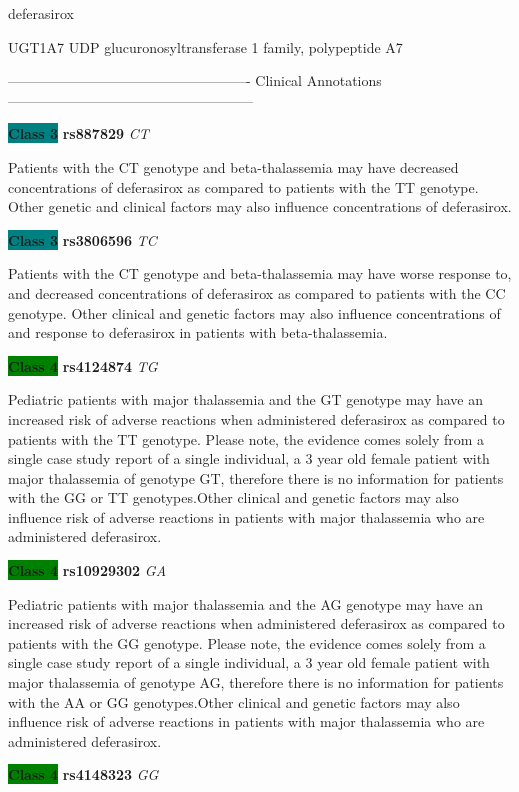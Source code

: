 \documentclass{resume} %
\begin{document}
\begin{rSection}{ deferasirox }
\begin{rSubsection}{ UGT1A7 }{ UDP glucuronosyltransferase 1 family, polypeptide A7 }{}{}
\item[] ---------------------------------------------------- Clinical Annotations -----------------------------------------------------\newline
\item \textbf{\colorbox{teal} {Class 3}} \textbf{ rs887829 } \textit{ CT }
\item[] Patients with the CT genotype and beta-thalassemia may have decreased concentrations of deferasirox as compared to patients with the TT genotype. Other genetic and clinical factors may also influence concentrations of deferasirox.\item \textbf{\colorbox{teal} {Class 3}} \textbf{ rs3806596 } \textit{ TC }
\item[] Patients with the CT genotype and beta-thalassemia may have worse response to, and decreased concentrations of deferasirox as compared to patients with the CC genotype. Other clinical and genetic factors may also influence concentrations of and response to deferasirox in patients with beta-thalassemia.\item \textbf{\colorbox{green} {Class 4}} \textbf{ rs4124874 } \textit{ TG }
\item[] Pediatric patients with major thalassemia and the GT genotype may have an increased risk of adverse reactions when administered deferasirox as compared to patients with the TT genotype. Please note, the evidence comes solely from a single case study report of a single individual, a 3 year old female patient with major thalassemia of genotype GT, therefore there is no information for patients with the GG or TT genotypes.Other clinical and genetic factors may also influence risk of adverse reactions in patients with major thalassemia who are administered deferasirox. \item \textbf{\colorbox{green} {Class 4}} \textbf{ rs10929302 } \textit{ GA }
\item[] Pediatric patients with major thalassemia and the AG genotype may have an increased risk of adverse reactions when administered deferasirox as compared to patients with the GG genotype. Please note, the evidence comes solely from a single case study report of a single individual, a 3 year old female patient with major thalassemia of genotype AG, therefore there is no information for patients with the AA or GG genotypes.Other clinical and genetic factors may also influence risk of adverse reactions in patients with major thalassemia who are administered deferasirox.\item \textbf{\colorbox{green} {Class 4}} \textbf{ rs4148323 } \textit{ GG }

\end{rSubsection}
\end{rSection}
\end{document}
